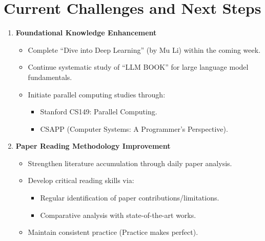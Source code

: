 \documentclass[conference]{IEEEtran}
\begin{document}
\section{Current Challenges and Next Steps}
\begin{enumerate}[leftmargin=*,noitemsep]
    \item \textbf{Foundational Knowledge Enhancement}
    \begin{itemize}[leftmargin=*]
        \item Complete “Dive into Deep Learning” (by Mu Li) within the coming week.
        \item Continue systematic study of “LLM BOOK” for large language model fundamentals.
        \item Initiate parallel computing studies through:
        \begin{itemize}[leftmargin=*]
            \item Stanford CS149: Parallel Computing.
            \item CSAPP (Computer Systems: A Programmer's Perspective).
        \end{itemize}
    \end{itemize}
    
    \item \textbf{Paper Reading Methodology Improvement}
    \begin{itemize}[leftmargin=*]
        \item Strengthen literature accumulation through daily paper analysis.
        \item Develop critical reading skills via:
        \begin{itemize}[leftmargin=*]
            \item Regular identification of paper contributions/limitations.
            \item Comparative analysis with state-of-the-art works.
        \end{itemize}
        \item Maintain consistent practice (Practice makes perfect).
    \end{itemize}
    

\end{enumerate}
\end{document}
